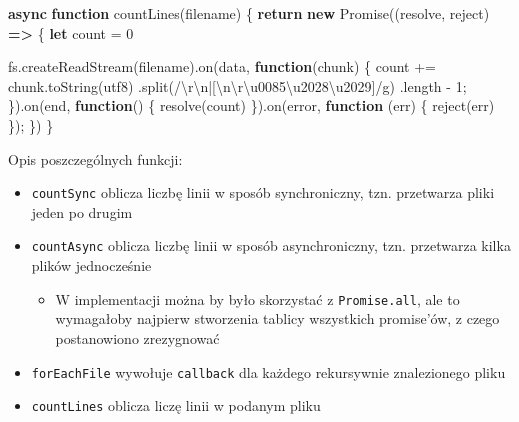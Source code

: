 \documentclass[11pt]{article}
\providecommand{\tightlist}{%
      \setlength{\itemsep}{0pt}\setlength{\parskip}{0pt}}
\newenvironment{Shaded}{}{}
\newcommand{\KeywordTok}[1]{\textcolor[rgb]{0.00,0.44,0.13}{\textbf{{#1}}}}
\newcommand{\DecValTok}[1]{\textcolor[rgb]{0.25,0.63,0.44}{{#1}}}
\newcommand{\StringTok}[1]{\textcolor[rgb]{0.25,0.44,0.63}{{#1}}}
\newcommand{\FunctionTok}[1]{\textcolor[rgb]{0.02,0.16,0.49}{{#1}}}
\newcommand{\NormalTok}[1]{{#1}}
\newcommand{\SpecialCharTok}[1]{\textcolor[rgb]{0.25,0.44,0.63}{{#1}}}
\newcommand{\SpecialStringTok}[1]{\textcolor[rgb]{0.73,0.40,0.53}{{#1}}}
\newcommand{\ControlFlowTok}[1]{\textcolor[rgb]{0.00,0.44,0.13}{\textbf{{#1}}}}
\newcommand{\OperatorTok}[1]{\textcolor[rgb]{0.40,0.40,0.40}{{#1}}}
\newcommand{\BuiltInTok}[1]{{#1}}
\newcommand{\AttributeTok}[1]{\textcolor[rgb]{0.49,0.56,0.16}{{#1}}}
\begin{document}
\begin{Shaded}
\begin{Highlighting}[]
\KeywordTok{async} \KeywordTok{function} \FunctionTok{countLines}\NormalTok{(filename) \{}
    \ControlFlowTok{return} \KeywordTok{new} \BuiltInTok{Promise}\NormalTok{((resolve}\OperatorTok{,}\NormalTok{ reject) }\KeywordTok{=\textgreater{}}\NormalTok{ \{}
        \KeywordTok{let}\NormalTok{ count }\OperatorTok{=} \DecValTok{0}

\NormalTok{        fs}\OperatorTok{.}\FunctionTok{createReadStream}\NormalTok{(filename)}\OperatorTok{.}\FunctionTok{on}\NormalTok{(}\StringTok{\textquotesingle{}data\textquotesingle{}}\OperatorTok{,} \KeywordTok{function}\NormalTok{(chunk) \{}
\NormalTok{            count }\OperatorTok{+=}\NormalTok{ chunk}\OperatorTok{.}\FunctionTok{toString}\NormalTok{(}\StringTok{\textquotesingle{}utf8\textquotesingle{}}\NormalTok{)}
                \OperatorTok{.}\FunctionTok{split}\NormalTok{(}\SpecialStringTok{/}\SpecialCharTok{\textbackslash{}r\textbackslash{}n|[\textbackslash{}n\textbackslash{}r\textbackslash{}u0085\textbackslash{}u2028\textbackslash{}u2029]}\SpecialStringTok{/g}\NormalTok{)}
                \OperatorTok{.}\AttributeTok{length} \OperatorTok{{-}} \DecValTok{1}\OperatorTok{;}
\NormalTok{        \})}\OperatorTok{.}\FunctionTok{on}\NormalTok{(}\StringTok{\textquotesingle{}end\textquotesingle{}}\OperatorTok{,} \KeywordTok{function}\NormalTok{() \{}
            \FunctionTok{resolve}\NormalTok{(count)}
\NormalTok{        \})}\OperatorTok{.}\FunctionTok{on}\NormalTok{(}\StringTok{\textquotesingle{}error\textquotesingle{}}\OperatorTok{,} \KeywordTok{function}\NormalTok{ (err) \{}
            \FunctionTok{reject}\NormalTok{(err)}
\NormalTok{        \})}\OperatorTok{;}
\NormalTok{    \})}
\NormalTok{\}}
\end{Highlighting}
\end{Shaded}

    Opis poszczególnych funkcji:

\begin{itemize}
\tightlist
\item
  \texttt{countSync} oblicza liczbę linii w sposób synchroniczny, tzn.
  przetwarza pliki jeden po drugim
\item
  \texttt{countAsync} oblicza liczbę linii w sposób asynchroniczny, tzn.
  przetwarza kilka plików jednocześnie

  \begin{itemize}
  \tightlist
  \item
    W implementacji można by było skorzystać z \texttt{Promise.all}, ale
    to wymagałoby najpierw stworzenia tablicy wszystkich promise'ów, z
    czego postanowiono zrezygnować
  \end{itemize}
\item
  \texttt{forEachFile} wywołuje \texttt{callback} dla każdego
  rekursywnie znalezionego pliku
\item
  \texttt{countLines} oblicza liczę linii w podanym pliku
\end{itemize}
\end{document}
